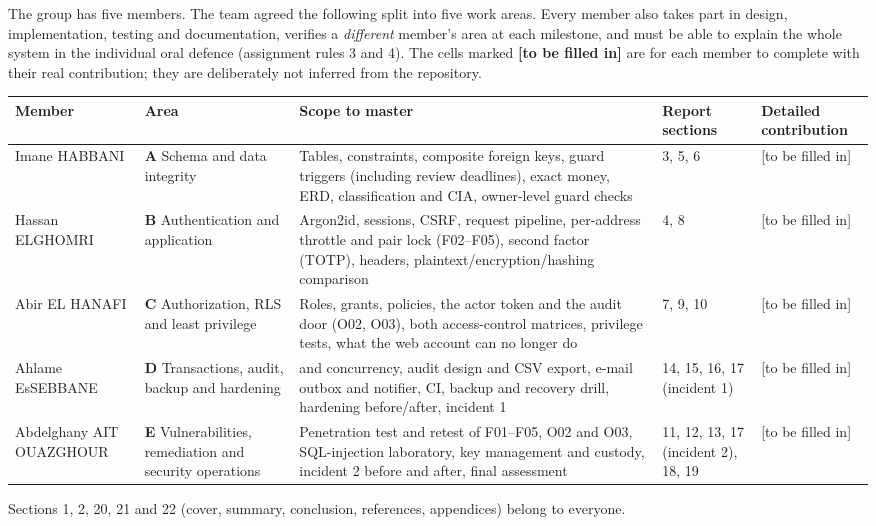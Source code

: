 The group has five members. The team agreed the following split into five work areas. Every member also takes part in design, implementation, testing and documentation, verifies a \emph{different} member's area at each milestone, and must be able to explain the whole system in the individual oral defence (assignment rules 3 and 4). The cells marked \textcolor{amber}{\textbf{[to be filled in]}} are for each member to complete with their real contribution; they are deliberately not inferred from the repository.
\begin{center}\scriptsize
\begin{tabularx}{\linewidth}{@{}L{2.3cm}L{2.35cm}YL{2.5cm}L{2.2cm}@{}}
\toprule\textbf{Member} & \textbf{Area} & \textbf{Scope to master} & \textbf{Report sections} & \textbf{Detailed contribution}\\\midrule
Imane HABBANI & \textbf{A} Schema and data integrity & Tables, constraints, composite foreign keys, guard triggers (including review deadlines), exact money, ERD, classification and CIA, owner-level guard checks & 3, 5, 6 & \textcolor{amber}{[to be filled in]}\\
Hassan ELGHOMRI & \textbf{B} Authentication and application & Argon2id, sessions, CSRF, request pipeline, per-address throttle and pair lock (F02--F05), second factor (TOTP), headers, plaintext/encryption/hashing comparison & 4, 8 & \textcolor{amber}{[to be filled in]}\\
Abir EL HANAFI & \textbf{C} Authorization, RLS and least privilege & Roles, grants, policies, the actor token and the audit door (O02, O03), both access-control matrices, privilege tests, what the web account can no longer do & 7, 9, 10 & \textcolor{amber}{[to be filled in]}\\
Ahlame EsSEBBANE & \textbf{D} Transactions, audit, backup and hardening &  and concurrency, audit design and CSV export, e-mail outbox and notifier, CI, backup and recovery drill, hardening before/after, incident 1 & 14, 15, 16, 17 (incident 1) & \textcolor{amber}{[to be filled in]}\\
Abdelghany AIT OUAZGHOUR & \textbf{E} Vulnerabilities, remediation and security operations & Penetration test and retest of F01--F05, O02 and O03, SQL-injection laboratory, key management and custody, incident 2 before and after, final assessment & 11, 12, 13, 17 (incident 2), 18, 19 & \textcolor{amber}{[to be filled in]}\\
\bottomrule\end{tabularx}\end{center}
Sections 1, 2, 20, 21 and 22 (cover, summary, conclusion, references, appendices) belong to everyone.

